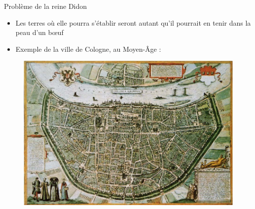 \documentclass[11pt,envcountsect,aspectratio=169]{beamer} %
\begin{document}
\begin{frame}{Problème de la reine Didon}

    \begin{itemize}
        \item Les terres où elle pourra s'établir seront \og autant qu'il pourrait en tenir dans la peau d'un b\oe{}uf\fg{}
        \item Exemple de la ville de Cologne, au Moyen-Âge :
    \end{itemize}
    
    \begin{figure}
        \includegraphics[scale=0.6]{img/cologne.jpg}
    \end{figure}

\end{frame}
\end{document}
